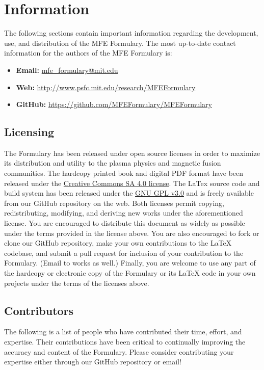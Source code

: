\chapter*{Information}
 The following sections
contain important information regarding the development, use, and
distribution of the MFE Formulary. The most up-to-date contact
information for the authors of the MFE Formulary is:
\begin{itemize}
  \item \textbf{Email:} \href{mailto:mfe_formulary@mit.edu}{mfe\_formulary@mit.edu}
  \item \textbf{Web:} \href{http://www.psfc.mit.edu/research/MFEFormulary}{http://www.psfc.mit.edu/research/MFEFormulary}
  \item \textbf{GitHub:} \href{https://github.com/MFEFormulary/MFEFormulary}{https://github.com/MFEFormulary/MFEFormulary}
\end{itemize}

\section*{Licensing}
The Formulary has been released under open source licenses in order to
maximize its distribution and utility to the plasma physics and
magnetic fusion communities. The hardcopy printed book and digital PDF
format have been released under the
\href{http://creativecommons.org/licenses/by-sa/4.0/legalcode}{Creative
  Commons SA 4.0 license}. The LaTex source code and build system has
been released under the
\href{http://www.gnu.org/licenses/gpl.html}{GNU GPL v3.0} and is
freely available from our GitHub repository on the web. Both licenses
permit copying, redistributing, modifying, and deriving new works
under the aforementioned license. You are encouraged to distribute
this document as widely as possible under the terms provided in the
license above. You are also encouraged to fork or clone our GitHub
repository, make your own contributions to the LaTeX codebase, and
submit a pull request for inclusion of your contribution to the
Formulary. (Email to works as well.) Finally, you are welcome to use
any part of the hardcopy or electronic copy of the Formulary or its
LaTeX code in your own projects under the terms of the licenses above.

\section*{Contributors}
The following is a list of people who have contributed their time,
effort, and expertise. Their contributions have been critical to
continually improving the accuracy and content of the Formulary. Please
consider contributing your expertise either through our GitHub
repository or email!

